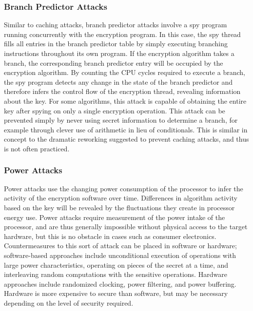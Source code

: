 \documentclass[times, 10pt,twocolumn]{article}
\begin{document}
\subsubsection{Branch Predictor Attacks}
Similar to caching attacks, branch predictor attacks involve a spy program running concurrently with the encryption program.  In this case, the spy thread fills all entries in the branch predictor table by simply executing branching instructions throughout its own program. If the encryption algorithm takes a branch, the corresponding branch predictor entry will be occupied by the encryption algorithm. By counting the CPU cycles required to execute a branch, the spy program detects any change in the state of the branch predictor and therefore infers the control flow of the encryption thread, revealing information about the key.  For some algorithms, this attack is capable of obtaining the entire key after spying on only a single encryption operation\cite{branchpredict}.  This attack can be prevented simply by never using secret information to determine a branch, for example through clever use of arithmetic in lieu of conditionals.  This is similar in concept to the dramatic reworking suggested to prevent caching attacks, and thus is not often practiced.

\subsubsection{Power Attacks}
Power attacks use the changing power consumption of the processor to infer the activity of the encryption software over time.  Differences in algorithm activity based on the key will be revealed by the fluctuations they create in processor energy use.  Power attacks require measurement of the power intake of the processor, and are thus generally impossible without physical access to the target hardware, but this is no obstacle in cases such as consumer electronics.  Countermeasures to this sort of attack can be placed in software or hardware; software-based approaches include unconditional execution of operations with large power characteristics, operating on pieces of the secret at a time, and interleaving random computations with the sensitive operations.  Hardware approaches include randomized clocking, power filtering, and power buffering.  Hardware is more expensive to secure than software, but may be necessary depending on the level of security required.\cite{mmthesis}
\end{document}
